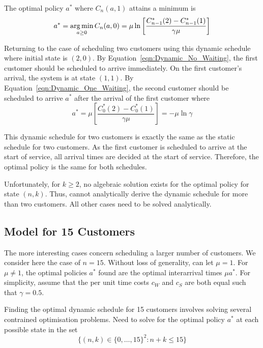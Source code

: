 The optimal policy $a^{*}$ where $C_{n} (a, 1)$ attains a minimum is
\begin{equation}
	a^{*} = \operatorname*{arg\,min}_{a \geq 0} C_{n} (a, 0) = \mu \ln \left[ \frac{C_{n - 1}^{*} (2) - C_{n - 1}^{*} (1)}{\gamma \mu} \right]
	\label{eqn:Dynamic_One_Waiting}
\end{equation}

Returning to the case of scheduling two customers using this dynamic schedule where initial state is $(2, 0)$. By Equation~\ref{eqn:Dynamic_No_Waiting}, the first customer should be scheduled to arrive immediately. On the first customer's arrival, the system is at state $(1, 1)$. By Equation~\ref{eqn:Dynamic_One_Waiting}, the second customer should be scheduled to arrive $a^{*}$ after the arrival of the first customer where
\begin{equation}
	a^{*} = \mu \left[ \frac{C_{0}^{*} (2) - C_{0}^{*} (1)}{\gamma \mu} \right] = - \mu \ln \gamma
\end{equation}

This dynamic schedule for two customers is exactly the same as the static schedule for two customers. As the first customer is scheduled to arrive at the start of service, all arrival times are decided at the start of service. Therefore, the optimal policy is the same for both schedules.

Unfortunately, for $k \geq 2$, no algebraic solution exists for the optimal policy for state $(n, k)$. Thus, cannot analytically derive the dynamic schedule for more than two customers. All other cases need to be solved analytically.

\subsection{Model for 15 Customers}
The more interesting cases concern scheduling a larger number of customers. We consider here the case of $n = 15$. Without loss of generality, can let $\mu = 1$. For $\mu \neq 1$, the optimal policies $a^{*}$ found are the optimal interarrival times $\mu a^{*}$. For simplicity, assume that the per unit time costs $c_{W}$ and $c_{S}$ are both equal such that $\gamma = 0.5$.

Finding the optimal dynamic schedule for 15 customers involves solving several contrained optimisation problems. Need to solve for the optimal policy $a^{*}$ at each possible state in the set
\begin{equation}
	\Big\{ (n, k) \in \{ 0, \ldots, 15 \}^{2} : n + k \leq 15 \Big\}
\end{equation}

